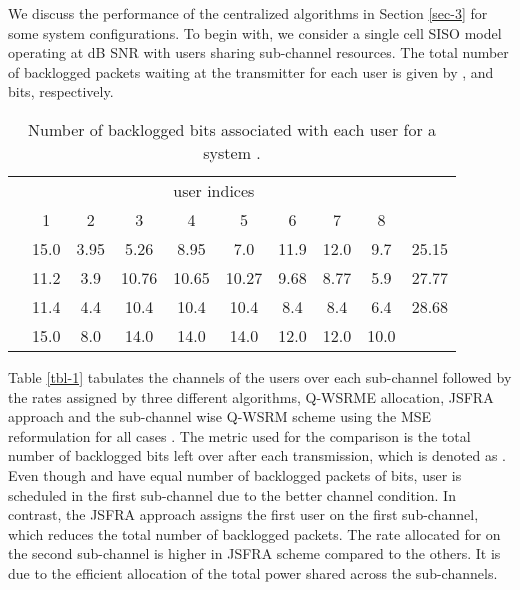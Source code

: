 We discuss the performance of the centralized algorithms in Section \ref{sec-3} for some system configurations. To begin with, we consider a single cell \ac{SISO} model operating at  dB \ac{SNR} with  users sharing  sub-channel resources. The total number of backlogged packets waiting at the transmitter for each user is given by ,  and  bits, respectively. 
\begin{table}
	\centering
	\caption{Number of backlogged bits associated with each user for a system .}
	\renewcommand{\arraystretch}{1.25} \scriptsize
	\begin{tabular}{|c|*{8}{c}|c|}
		\hline
		\multirow{2}{*}{\me{q}} & \multicolumn{8}{c|}{user indices} & \multirow{2}{*}{\me{\chi}} \\
		\cline{2-9}
		& 1 & 2 & 3 & 4 & 5 & 6 & 7 & 8 & \\
		\hline
		\hline
		\me{1} & 15.0 & 3.95 & 5.26 & 8.95 & 7.0 & 11.9 & 12.0 & 9.7 & 25.15 \\
		\me{2} & 11.2 & 3.9 & 10.76 & 10.65 & 10.27 & 9.68 & 8.77 & 5.9 & 27.77 \\
		\me{\infty} & 11.4 & 4.4 & 10.4 & 10.4 & 10.4 & 8.4 &  8.4 &  6.4 & 28.68 \\
		\hline
		\me{Q_k}  & 15.0 &  8.0 &  14.0 & 14.0 &  14.0 & 12.0 & 12.0 & 10.0  \\
		\cline{1-9}
	\end{tabular}
	\label{tbl-3}
\end{table}

Table \ref{tbl-1} tabulates the channels of the users over each sub-channel followed by the rates assigned by three different algorithms, \ac{Q-WSRME} allocation, \ac{JSFRA} approach and the sub-channel wise \ac{Q-WSRM} scheme using the \ac{MSE} reformulation for all cases \cite{christensen2008weighted}. The metric used for the comparison is the total number of backlogged bits left over after each transmission, which is denoted as . Even though  and  have equal number of backlogged packets of  bits, user  is scheduled in the first sub-channel due to the better channel condition. In contrast, the \ac{JSFRA} approach assigns the first user on the first sub-channel, which reduces the total number of backlogged packets. The rate allocated for  on the second sub-channel is higher in \ac{JSFRA} scheme compared to the others. It is due to the efficient allocation of the total power shared across the sub-channels.

